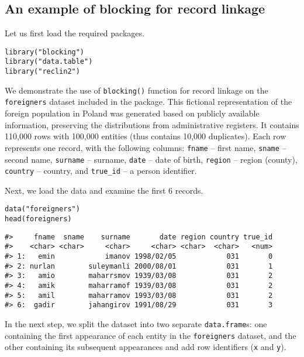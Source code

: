 \subsection{An example of blocking for record linkage}\label{an-example-of-blocking-for-record-linkage}

Let us first load the required packages.

\begin{verbatim}
library("blocking")
library("data.table")
library("reclin2")
\end{verbatim}

We demonstrate the use of \texttt{blocking()} function for record linkage on the
\texttt{foreigners} dataset included in the package. This fictional
representation of the foreign population in Poland was generated based
on publicly available information, preserving the distributions from
administrative registers. It contains 110,000 rows with 100,000
entities (thus contains 10,000 duplicates).
Each row represents one record, with the following columns:
\texttt{fname} -- first name, \texttt{sname} -- second name, \texttt{surname} -- surname,
\texttt{date} -- date of birth, \texttt{region} -- region (county), \texttt{country} -- country, and
\texttt{true\_id} -- a person identifier.

Next, we load the data and examine the first 6 records.

\begin{verbatim}
data("foreigners")
head(foreigners)
\end{verbatim}

\begin{verbatim}
#>     fname  sname    surname       date region country true_id
#>    <char> <char>     <char>     <char> <char>  <char>   <num>
#> 1:   emin            imanov 1998/02/05            031       0
#> 2: nurlan        suleymanli 2000/08/01            031       1
#> 3:   amio        maharrsmov 1939/03/08            031       2
#> 4:   amik        maharramof 1939/03/08            031       2
#> 5:   amil        maharramov 1993/03/08            031       2
#> 6:  gadir        jahangirov 1991/08/29            031       3
\end{verbatim}

In the next step, we split the dataset into two separate \texttt{data.frame}s:
one containing the first
appearance of each entity in the \texttt{foreigners} dataset, and the other
containing its subsequent appearances and add row identifiers (\texttt{x} and \texttt{y}).

